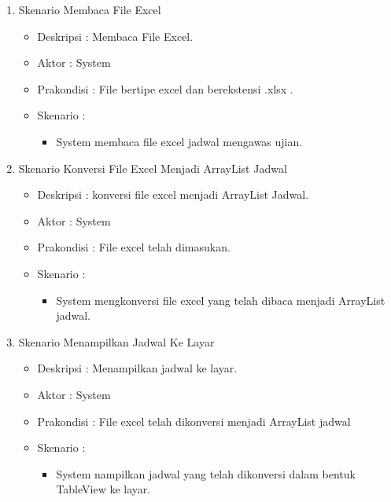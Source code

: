 \begin{enumerate}
		\item Skenario Membaca File Excel
		{\renewcommand\labelitemi{}
		\begin{itemize}
			\item Deskripsi		: Membaca File Excel.
			\item Aktor				: System 
			\item Prakondisi	: File bertipe excel dan berekstensi .xlsx .
			\item Skenario		:
				\begin{itemize}
					\item System membaca file excel jadwal mengawas ujian.
				\end{itemize}
		\end{itemize}
		}
		
		\item Skenario Konversi File Excel Menjadi ArrayList Jadwal
		{\renewcommand\labelitemi{}
		\begin{itemize}
			\item Deskripsi		: konversi file excel menjadi ArrayList Jadwal.
			\item Aktor				: System 
			\item Prakondisi	: File excel telah dimasukan.
			\item Skenario		:
				\begin{itemize}
					\item System mengkonversi file excel yang telah dibaca menjadi ArrayList jadwal.
				\end{itemize}
		\end{itemize}
		}
		
		\item Skenario Menampilkan Jadwal Ke Layar
		{\renewcommand\labelitemi{}
		\begin{itemize}
			\item Deskripsi		: Menampilkan jadwal ke layar.
			\item Aktor				: System 
			\item Prakondisi	: File excel telah dikonversi menjadi ArrayList jadwal
			\item Skenario		:
				\begin{itemize}
					\item System nampilkan jadwal yang telah dikonversi dalam bentuk TableView ke layar.
				\end{itemize}
		\end{itemize}
		}
		

\end{enumerate}
